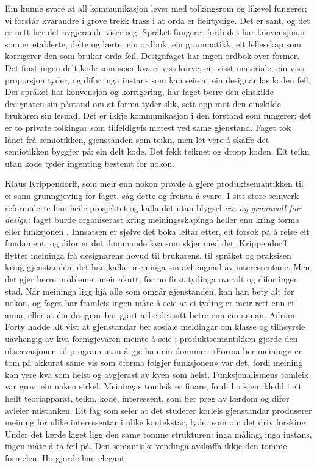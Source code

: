 Ein kunne svare at all kommunikasjon lever med tolkingsrom og likevel fungerer; vi forstår kvarandre i grove trekk trass i at orda er fleirtydige. Det er sant, og det er nett her det avgjerande viser seg. Språket fungerer fordi det har konvensjonar som er etablerte, delte og lærte: ein ordbok, ein grammatikk, eit fellesskap som korrigerer den som brukar orda feil. Designfaget har ingen ordbok over former. Det finst ingen delt kode som seier kva ei viss kurve, eit visst materiale, ein viss proporsjon tyder, og difor inga instans som kan seie at ein designar las koden feil. Der språket har konvensjon og korrigering, har faget berre den einskilde designaren sin påstand om at forma tyder slik, sett opp mot den einskilde brukaren sin lesnad. Det er ikkje kommunikasjon i den forstand som fungerer; det er to private tolkingar som tilfeldigvis møtest ved same gjenstand. Faget tok lånet frå semiotikken, gjenstanden som teikn, men lét vere å skaffe det semiotikken byggjer på: ein delt kode. Det fekk teiknet og dropp koden. Eit teikn utan kode tyder ingenting bestemt for nokon.

Klaus Krippendorff, som meir enn nokon prøvde å gjere produktsemantikken til ei sann grunngjeving for faget, såg dette og freista å svare. I sitt store seinverk reformulerte han heile prosjektet og kalla det utan blygsel \emph{ein ny grunnvoll for design}: faget burde organiserast kring meiningsskapinga heller enn kring forma eller funksjonen \autocite{krippendorff2006}. Innsatsen er sjølve det boka leitar etter, eit forsøk på å reise eit fundament, og difor er det dømmande kva som skjer med det. Krippendorff flytter meininga frå designarens hovud til brukarens, til språket og praksisen kring gjenstanden, det han kallar meininga sin avhengnad av interessentane. Men det gjer berre problemet meir akutt, for no finst tydinga overalt og difor ingen stad. Når meininga ligg hjå alle som omgår gjenstanden, kan han bety alt for nokon, og faget har framleis ingen måte å seie at ei tyding er meir rett enn ei anna, eller at éin designar har gjort arbeidet sitt betre enn ein annan. Adrian Forty hadde alt vist at gjenstandar ber sosiale meldingar om klasse og tilhøyrsle uavhengig av kva formgjevaren meinte å seie \autocite{forty1986}; produktsemantikken gjorde den observasjonen til program utan å gje han ein dommar. «Forma ber meining» er tom på akkurat same vis som «forma følgjer funksjonen» var det, fordi meining kan vere kva som helst og avgjerast av kven som helst. Funksjonalismens tomleik var grov, ein naken sirkel. Meiningas tomleik er finare, fordi ho kjem kledd i eit heilt teoriapparat, teikn, kode, interessent, som ber preg av lærdom og difor avleier mistanken. Eit fag som seier at det studerer korleis gjenstandar produserer meining for ulike interessentar i ulike kontekstar, lyder som om det driv forsking. Under det lærde laget ligg den same tomme strukturen: inga måling, inga instans, ingen måte å ta feil på. Den semantiske vendinga avskaffa ikkje den tomme formelen. Ho gjorde han elegant.


